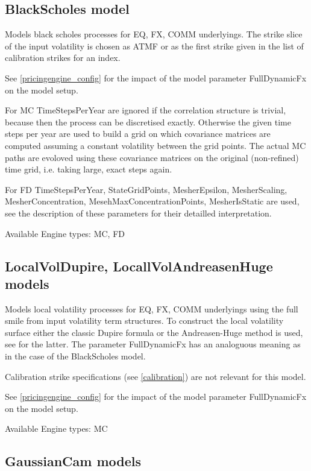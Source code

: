 \subsection{BlackScholes model}\label{blackscholes}

Models black scholes processes for EQ, FX, COMM underlyings. The strike slice of the input volatility is chosen as ATMF
or as the first strike given in the list of calibration strikes for an index.

See \ref{pricingengine_config} for the impact of the model parameter FullDynamicFx on the model setup.

For MC TimeStepsPerYear are ignored if the correlation structure is trivial, because then the process can be discretised
exactly. Otherwise the given time steps per year are used to build a grid on which covariance matrices are computed
assuming a constant volatility between the grid points. The actual MC paths are evoloved using these covariance matrices
on the original (non-refined) time grid, i.e. taking large, exact steps again.

For FD TimeStepsPerYear, StateGridPoints, MesherEpsilon, MesherScaling, MesherConcentration,
MesehMaxConcentrationPoints, MesherIsStatic are used, see the description of these parameters for their detailled
interpretation.

\smallskip
Available Engine types: MC, FD

\subsection{LocalVolDupire, LocallVolAndreasenHuge models}

Models local volatility processes for EQ, FX, COMM underlyings using the full smile from input volatility term
structures. To construct the local volatility surface either the classic Dupire formula or the Andreasen-Huge method is
used, see \cite{andreasen_huge_localvol} for the latter. The parameter FullDynamicFx has an analoguous meaning as in the
case of the BlackScholes model.

Calibration strike specifications (see \ref{calibration}) are not relevant for this model.

See \ref{pricingengine_config} for the impact of the model parameter FullDynamicFx on the model setup.

\smallskip
Available Engine types: MC

\subsection{GaussianCam models}

